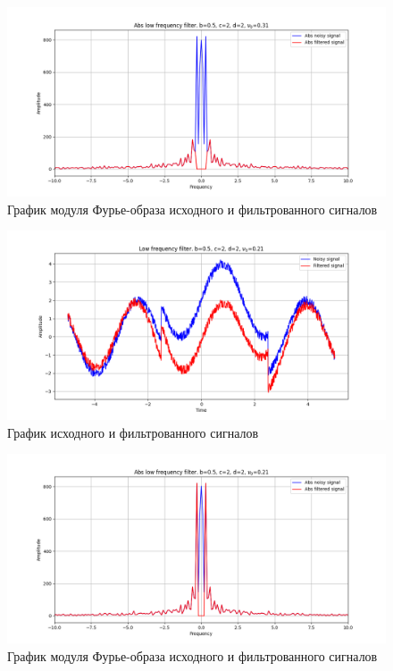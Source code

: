 \documentclass[a4paper, 12pt]{article}
\begin{document}
    \begin{figure}[!htb]
        \centering
        \includegraphics[scale=0.485]{17_abs_u_U_nolow.png}
        \captionsetup{skip=0pt}
        \caption{График модуля Фурье-образа исходного и фильтрованного сигналов}
        \label{fig:fig60}
    \end{figure}
    \begin{figure}[!htb]
        \centering
        \includegraphics[scale=0.485]{18_u_flt_u_nolow.png}
        \captionsetup{skip=0pt}
        \caption{График исходного и фильтрованного сигналов}
        \label{fig:fig61}
    \end{figure}
    \begin{figure}[!htb]
        \centering
        \includegraphics[scale=0.485]{18_abs_u_U_nolow.png}
        \captionsetup{skip=0pt}
        \caption{График модуля Фурье-образа исходного и фильтрованного сигналов}
        \label{fig:fig62}
    \end{figure}
\end{document}
